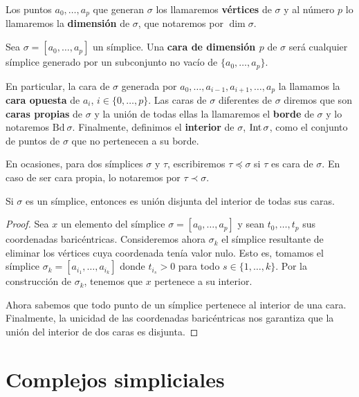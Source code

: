 Los puntos $a_{0}, \ldots, a_{p}$ que generan $\sigma$ los llamaremos \textbf{vértices}
de $\sigma$ y al número $p$ lo llamaremos la \textbf{dimensión} de $\sigma$, que
notaremos por $\dim \sigma$.

\begin{definicion}
	Sea $\sigma=[a_{0}, \ldots, a_{p}]$ un símplice. Una \textbf{cara de dimensión
		$p$} de $\sigma$ será cualquier símplice generado por un subconjunto no vacío de
	$\{a_{0}, \ldots, a_{p}\}$.
\end{definicion}
En particular, la cara de $\sigma$ generada por
$a_{0}, \ldots, a_{i-1}, a_{i+1}, \ldots, a_{p}$ la llamamos la \textbf{cara
	opuesta} de $a_{i}$, $i \in \{0, \ldots, p\}$. Las caras de $\sigma$ diferentes de
$\sigma$ diremos que son \textbf{caras propias} de $\sigma$ y la unión de todas
ellas la llamaremos el \textbf{borde} de $\sigma$ y lo notaremos $\text{Bd}\ \sigma$.
Finalmente, definimos el \textbf{interior} de $\sigma$, $\operatorname{Int} \sigma$, como
el conjunto de puntos de $\sigma$ que no pertenecen a su borde.

En ocasiones, para dos símplices $\sigma$ y $\tau$, escribiremos
$\tau \preceq \sigma$ si $\tau$ es cara de $\sigma$. En caso de ser cara propia,
lo notaremos por $\tau \prec \sigma$.

\begin{proposicion}
	\label{prop:union-disjunta-simplices} Si $\sigma$ es un símplice, entonces es
	unión disjunta del interior de todas sus caras.
\end{proposicion}
\begin{proof}
	Sea $x$ un elemento del símplice $\sigma = [a_{0},\ldots,a_{p}]$ y sean $t_{0},
	\ldots ,t_{p}$ sus coordenadas baricéntricas. Consideremos ahora $\sigma_{k}$
	el símplice resultante de eliminar los vértices cuya coordenada tenía valor
	nulo. Esto es, tomamos el símplice $\sigma_{k}= [a_{i_1}, \ldots, a_{i_k}]$
	donde $t_{i_s}> 0$ para todo $s \in \{1, \ldots, k\}$. Por la construcción de $\sigma
	_{k}$, tenemos que $x$ pertenece a su interior.
	
	Ahora sabemos que todo punto de un símplice pertenece al interior de una cara.
	Finalmente, la unicidad de las coordenadas baricéntricas nos garantiza que la
	unión del interior de dos caras es disjunta.
\end{proof}

\section{Complejos simpliciales}

